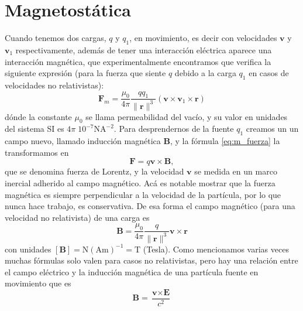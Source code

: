 \documentclass[11pt,a4paper]{article}
\numberwithin{equation}{section}
\begin{document}
\section{Magnetostática}
Cuando tenemos dos cargas, $q$ y $q_1$, en movimiento, es decir con velocidades $\textbf{v}$ y $\textbf{v}_1$ respectivamente, además de tener una interacción eléctrica aparece una interacción magnética, que experimentalmente encontramos que verifica la siguiente expresión (para la fuerza que siente $q$ debido a la carga $q_1$ en casos de velocidades no relativistas):
\begin{equation}
    \textbf{F}_m = \frac{\mu_0}{4\pi} \frac{q q_1}{\|\textbf{r}\|^3} (\textbf{v} \times \textbf{v}_1 \times \textbf{r})
    \label{eq:m_fuerza}
\end{equation}
dónde la constante $\mu_0$ se llama permeabilidad del vacío, y su valor en unidades del sistema SI es $4\pi \; 10^{-7} \text{N}\text{A}^{-2}$. Para desprendernos de la fuente $q_1$ creamos un un campo nuevo, llamado inducción magnética $\textbf{B}$, y la fórmula \ref{eq:m_fuerza} la transformamos en
\begin{equation}
    \textbf{F} = q \textbf{v} \times \textbf{B},
    \label{eq:m_lorentz}
\end{equation}
que se denomina fuerza de Lorentz, y la velocidad $\textbf{v}$ se medida en un marco inercial adherido al campo magnético. Acá es notable mostrar que la fuerza magnética es siempre perpendicular a la velocidad de la partícula, por lo que nunca hace trabajo, es conservativa. De esa forma el campo magnético (para una velocidad no relativista) de una carga es
\begin{equation}
    \textbf{B} = \frac{\mu_0}{4\pi}\frac{q}{\|\textbf{r}\|^3} \textbf{v} \times \textbf{r}
    \label{eq:m_campo_particula}
\end{equation}
con unidades $[\textbf{B}] = \text{N}(\text{A}\text{m})^{-1} = \text{T}$ (Tesla). Como mencionamos varias veces muchas fórmulas solo valen para casos no relativistas, pero hay una relación entre el campo eléctrico y la inducción magnética de una partícula fuente en movimiento que es
\begin{equation}
    \textbf{B} = \frac{\textbf{v} \times \textbf{E}}{c^2}
    \label{eq:m_magnetico_electrico}
\end{equation}
\end{document}
